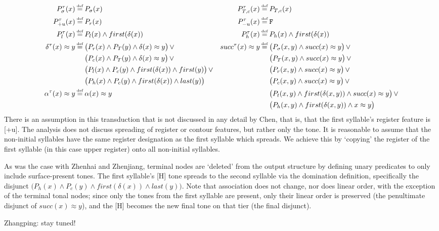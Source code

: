 \documentclass{article}
\newcommand\myeq{\mathrel{\stackrel{\makebox[0pt]{\mbox{\normalfont\tiny def}}}{=}}}
\newcommand{\ap}{\approx}
\begin{document}
\begin{equation}
\begin{aligned}
P^{\tau}_{\sigma}(x)&\myeq P_{\sigma}(x) & P^{\tau}_{T,c}(x)&\myeq P_{T,c}(x) \\
P^{\tau}_{+u}(x)&\myeq P_{r}(x) & P^{\tau}_{-u}(x)&\myeq\mathtt{F} \\
P^{\tau}_{l}(x)&\myeq P_{l}(x)\land first(\delta(x)) & P^{\tau}_{h}(x)&\myeq P_{h}(x)\land first(\delta(x)) \\
\delta^{\tau}(x)\ap y &\myeq \big(P_{r}(x)\land P_{T}(y)\land \delta(x)\ap y\big)\,\lor & succ^{\tau}(x)\ap y &\myeq \big(P_{\sigma}(x,y)\land succ(x)\ap y\big)\,\lor \\
&\quad\,\,\big(P_{c}(x)\land P_{T}(y)\land \delta(x)\ap y\big)\,\lor & &\quad\,\,\big(P_{T}(x,y) \land succ(x)\ap y\big)\,\lor \\
&\quad\,\,\big(P_{l}(x)\land P_{c} (y) \land first(\delta(x)) \land first(y)\big)\,\lor & &\quad\,\,\big(P_{r}(x,y) \land succ(x)\ap y\big)\,\lor \\ 
&\quad\,\,\big(P_{h}(x)\land P_{c} (y)\land first(\delta(x)) \land last (y) \big) & &\quad\,\,\big(P_{c}(x,y) \land succ(x)\ap y\big)\,\lor \\
\alpha^{\tau}(x)\ap y&\myeq \alpha(x) \ap y & &\quad\,\,\big(P_{t}(x,y)\land first(\delta(x,y))\land succ(x)\ap y\big)\,\lor \\
& & &\quad\,\,\big(P_{h}(x,y)\land first(\delta(x,y))\land x\ap y\big) \\
\end{aligned}
\end{equation}
There is an assumption in this transduction that is not discussed in any detail by Chen, that is, that the first syllable's register feature is [+u]. The analysis does not discuss spreading of register or contour features, but rather only the tone. It is reasonable to assume that the non-initial syllables have the same register designation as the first syllable which spreads. We achieve this by `copying' the register of the first syllable (in this case upper register) onto all non-initial syllables. \par
As was the case with Zhenhai and Zhenjiang, terminal nodes are `deleted' from the output structure by defining unary predicates to only include surface-present tones. The first syllable's [H] tone spreads to the second syllable via the domination definition, specifically the disjunct $\big(P_{h}(x)\land P_{c} (y)\land first(\delta(x)) \land last (y) \big)$. Note that association does not change, nor does linear order, with the exception of the terminal tonal nodes; since only the tones from the first syllable are present, only their linear order is preserved (the penultimate disjunct of $succ(x)\ap y$), and the [H] becomes the new final tone on that tier (the final disjunct). \par
Zhangping: stay tuned!


\end{document}
